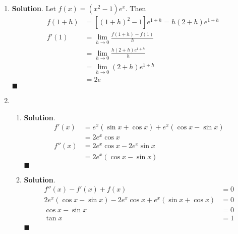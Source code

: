 \documentclass[12pt]{article}
\newenvironment*{sol}{\par \textbf{Solution}.}{\hfill$\blacksquare$}
\begin{document}
\begin{enumerate}
\begin{enumerate}
\begin{enumerate}
\begin{sol}
\begin{align*}
\begin{cases}
                            \theta-\phi=2n\pi+\pi\\
                            \theta+\phi=2n\pi-\pi/3
                        \end{cases}\\
                        \implies&\theta=\pi/3, \phi=4\pi/3
                    \end{align*}
                \end{sol}
            \end{enumerate}
        \end{enumerate}
        \item \begin{sol}
            Let $f(x)=(x^2-1)e^x$. Then \begin{align*}
                f(1+h)&=[(1+h)^2-1]e^{1+h}=h(2+h)e^{1+h}\\
                f'(1)&=\lim_{h\to 0}\frac{f(1+h)-f(1)}{h}\\
                &=\lim_{h\to 0}\frac{h(2+h)e^{1+h}}{h}\\
                &=\lim_{h\to 0}(2+h)e^{1+h}\\
                &=2e
            \end{align*}
        \end{sol}
        \item \begin{enumerate}
            \item \begin{sol}
                \begin{align*}
                    f'(x)&=e^x(\sin{x}+\cos{x})+e^x(\cos{x}-\sin{x})\\
                    &=2e^x\cos{x}\\
                    f''(x)&=2e^x\cos{x}-2e^x\sin{x}\\
                    &=2e^x(\cos{x}-\sin{x})
                \end{align*}
            \end{sol}
            \item \begin{sol}
                \begin{align*}
                    f''(x)-f'(x)+f(x)&=0\\
                    2e^x(\cos{x}-\sin{x})-2e^x\cos{x}+e^x(\sin{x}+\cos{x})&=0\\
                    \cos{x}-\sin{x}&=0\\
                    \tan{x}&=1\\

\end{align*}
\end{sol}
\end{enumerate}
\end{enumerate}
\end{document}
